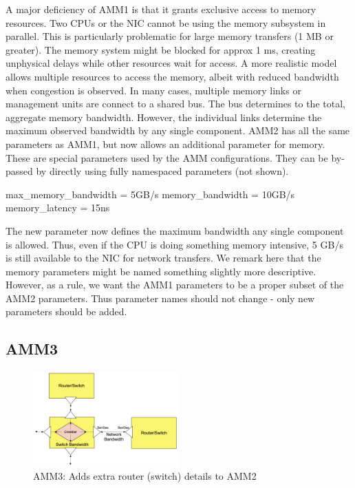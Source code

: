 A major deficiency of AMM1 is that it grants exclusive access to memory resources.
Two CPUs or the NIC cannot be using the memory subsystem in parallel.
This is particularly problematic for large memory transfers (1 MB or greater).
The memory system might be blocked for approx 1 ms,
creating unphysical delays while other resources wait for access.
A more realistic model allows multiple resources to access the memory,
albeit with reduced bandwidth when congestion is observed.
In many cases, multiple memory links or management units are connect to a shared bus.
The bus determines to the total, aggregate memory bandwidth.
However, the individual links determine the maximum observed bandwidth by any single component.
AMM2 has all the same parameters as AMM1, but now allows an additional parameter for memory.
These are special parameters used by the AMM configurations.
They can be by-passed by directly using fully namespaced parameters (not shown).

\begin{ViFile}
max_memory_bandwidth = 5GB/s
memory_bandwidth = 10GB/s
memory_latency = 15ns
\end{ViFile}
The new parameter  now defines the maximum bandwidth any single component is allowed.
Thus, even if the CPU is doing something memory intensive, 5 GB/s is still available to the NIC for network transfers.
We remark here that the memory parameters might be named something slightly more descriptive.
However, as a rule, we want the AMM1 parameters to be a proper subset of the AMM2 parameters.
Thus parameter names should not change - only new parameters should be added.

\subsection{AMM3}
\label{subsec:ammThree}

\begin{figure}
\begin{center}
\includegraphics[width=0.5\textwidth]{figures/amm/amm3_switch.png}
\end{center}
\caption{AMM3: Adds extra router (switch) details to AMM2}
\label{fig:amm3}
\end{figure}

